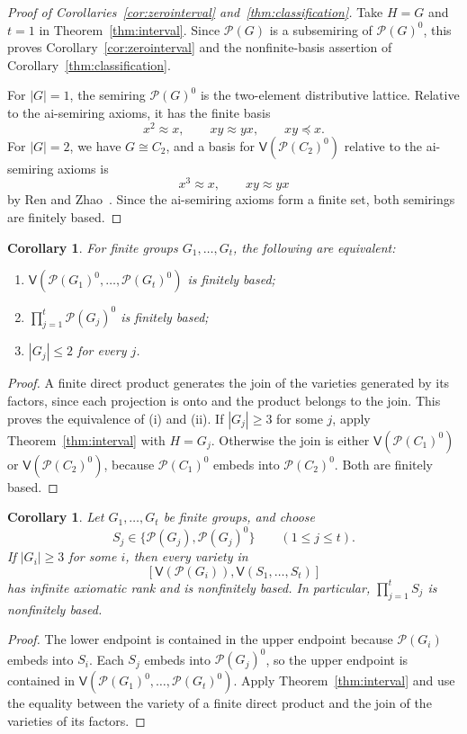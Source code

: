 \documentclass[11pt,reqno]{amsart}
\newtheorem{corollary}[theorem]{Corollary}
\theoremstyle{definition}
\numberwithin{equation}{section}
\newcommand{\Pow}{\mathcal{P}}
\newcommand{\Full}[1]{\mathcal{P}(#1)^0}
\newcommand{\Var}{\mathsf{V}}
\renewcommand{\leq}{\leqslant}
\renewcommand{\geq}{\geqslant}
\begin{document}
\begin{proof}[Proof of Corollaries~\ref{cor:zerointerval} and~\ref{thm:classification}]
Take $H=G$ and $t=1$ in Theorem~\ref{thm:interval}. Since $\Pow(G)$ is a subsemiring of $\Full{G}$, this proves Corollary~\ref{cor:zerointerval} and the nonfinite-basis assertion of Corollary~\ref{thm:classification}.

For $|G|=1$, the semiring $\Full{G}$ is the two-element distributive lattice. Relative to the ai-semiring axioms, it has the finite basis
\[
 x^2\approx x,\qquad xy\approx yx,\qquad xy\preceq x.
\]
For $|G|=2$, we have $G\cong C_2$, and a basis for $\Var(\Full{C_2})$ relative to the ai-semiring axioms is
\begin{equation}\label{eq:C2basis}
 x^3\approx x,\qquad xy\approx yx
\end{equation}
by Ren and Zhao~\cite[Lemma~3.7]{rz}. Since the ai-semiring axioms form a finite set, both semirings are finitely based.
\end{proof}

\begin{corollary}\label{cor:finitejoins}
For finite groups $G_1,\ldots,G_t$, the following are equivalent:
\begin{enumerate}[label=\textup{(\roman*)},leftmargin=2.4em]
\item $\Var(\Full{G_1},\ldots,\Full{G_t})$ is finitely based;
\item $\prod_{j=1}^{t}\Full{G_j}$ is finitely based;
\item $|G_j|\leq 2$ for every $j$.
\end{enumerate}
\end{corollary}
\begin{proof}
A finite direct product generates the join of the varieties generated by its factors, since each projection is onto and the product belongs to the join. This proves the equivalence of (i) and (ii). If $|G_j|\geq 3$ for some $j$, apply Theorem~\ref{thm:interval} with $H=G_j$. Otherwise the join is either $\Var(\Full{C_1})$ or $\Var(\Full{C_2})$, because $\Full{C_1}$ embeds into $\Full{C_2}$. Both are finitely based.
\end{proof}

\begin{corollary}\label{cor:mixed}
Let $G_1,\ldots,G_t$ be finite groups, and choose
\[
 S_j\in\{\Pow(G_j),\Full{G_j}\}\qquad(1\leq j\leq t).
\]
If $|G_i|\geq 3$ for some $i$, then every variety in
\[
 [\Var(\Pow(G_i)),\Var(S_1,\ldots,S_t)]
\]
has infinite axiomatic rank and is nonfinitely based. In particular, $\prod_{j=1}^{t}S_j$ is nonfinitely based.
\end{corollary}
\begin{proof}
The lower endpoint is contained in the upper endpoint because $\Pow(G_i)$ embeds into $S_i$. Each $S_j$ embeds into $\Full{G_j}$, so the upper endpoint is contained in $\Var(\Full{G_1},\ldots,\Full{G_t})$. Apply Theorem~\ref{thm:interval} and use the equality between the variety of a finite direct product and the join of the varieties of its factors.
\end{proof}
\end{document}
